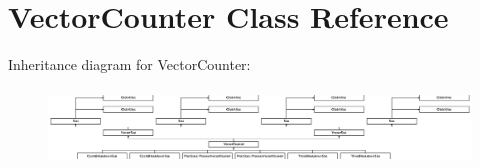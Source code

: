 \hypertarget{classVectorCounter}{\section{Vector\-Counter Class Reference}
\label{classVectorCounter}
}
Inheritance diagram for Vector\-Counter\-:\begin{figure}[H]
\begin{center}
\leavevmode
\includegraphics[height=2.009569cm]{classVectorCounter}
\end{center}
\end{figure}

